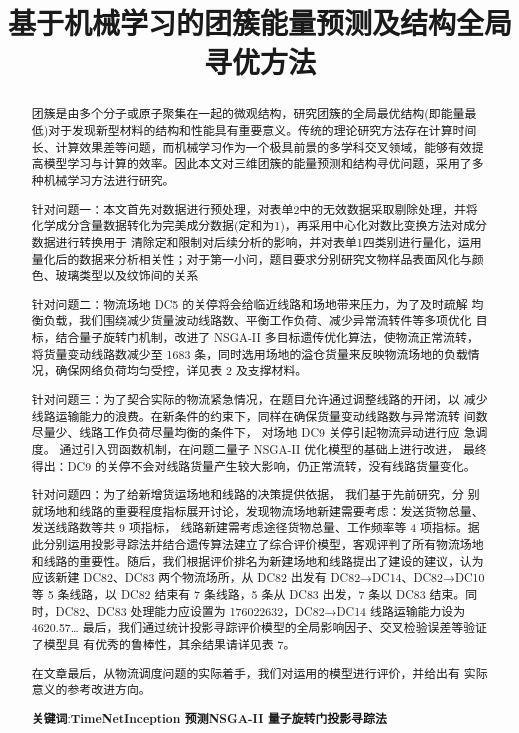 \documentclass[normalsize]{ctexart}
\title{\heiti \zihao{5}基于机械学习的团簇能量预测及结构全局寻优方法}
\begin{document}
	\date{}
	\maketitle
	\thispagestyle{empty}
	\begin{abstract}
		
		{\songti {}团簇是由多个分子或原子聚集在一起的微观结构，研究团簇的全局最优结构(即能量最低)对于发现新型材料的结构和性能具有重要意义。传统的理论研究方法存在计算时间长、计算效果差等问题，而机械学习作为一个极具前景的多学科交叉领域，能够有效提高模型学习与计算的效率。因此本文对三维团簇的能量预测和结构寻优问题，采用了多种机械学习方法进行研究。
			\par
			针对问题一：本文首先对数据进行预处理，对表单2中的无效数据采取剔除处理，并将化学成分含量数据转化为完美成分数据(定和为1)，再采用中心化对数比变换方法对成分数据进行转换用于
			清除定和限制对后续分析的影响，并对表单1四类别进行量化，运用量化后的数据来分析相关性；对于第一小问，题目要求分别研究文物样品表面风化与颜色、玻璃类型以及纹饰间的关系
			\par
			针对问题二：物流场地 DC5 的关停将会给临近线路和场地带来压力，为了及时疏解
			均衡负载，我们围绕减少货量波动线路数、平衡工作负荷、减少异常流转件等多项优化
			目标，结合量子旋转门机制，改进了 NSGA-II 多目标遗传优化算法，使物流正常流转，
			将货量变动线路数减少至 1683 条，同时选用场地的溢仓货量来反映物流场地的负载情
			况，确保网络负荷均匀受控，详见表 2 及支撑材料。
			\par
			针对问题三：为了契合实际的物流紧急情况，在题目允许通过调整线路的开闭，以
			减少线路运输能力的浪费。在新条件的约束下，同样在确保货量变动线路数与异常流转
			间数尽量少、线路工作负荷尽量均衡的条件下， 对场地 DC9 关停引起物流异动进行应
			急调度。 通过引入罚函数机制，在问题二量子 NSGA-II 优化模型的基础上进行改进，
			最终得出：DC9 的关停不会对线路货量产生较大影响，仍正常流转，没有线路货量变化。
			\par
			针对问题四：为了给新增货运场地和线路的决策提供依据， 我们基于先前研究，分
			别就场地和线路的重要程度指标展开讨论，发现物流场地新建需要考虑：发送货物总量、
			发送线路数等共 9 项指标， 线路新建需考虑途径货物总量、工作频率等 4 项指标。据
			此分别运用投影寻踪法并结合遗传算法建立了综合评价模型，客观评判了所有物流场地
			和线路的重要性。随后，我们根据评价排名为新建场地和线路提出了建设的建议，认为
			应该新建 DC82、DC83 两个物流场所，从 DC82 出发有 DC82→DC14、DC82→DC10
			等 5 条线路，以 DC82 结束有 7 条线路，5 条从 DC83 出发，7 条以 DC83 结束。同时，DC82、DC83 处理能力应设置为 176022632，DC82→DC14 线路运输能力设为 4620.57…
			最后，我们通过统计投影寻踪评价模型的全局影响因子、交叉检验误差等验证了模型具
			有优秀的鲁棒性，其余结果请详见表 7。
			\par
			在文章最后，从物流调度问题的实际着手，我们对运用的模型进行评价，并给出有
			实际意义的参考改进方向。}
		
		
		\textbf{关键词}:{\quad \textbf{TimeNet\quad Inception 预测\quad NSGA-II 量子旋转门\quad 投影寻踪法}}
	\end{abstract}
	
\end{document}
